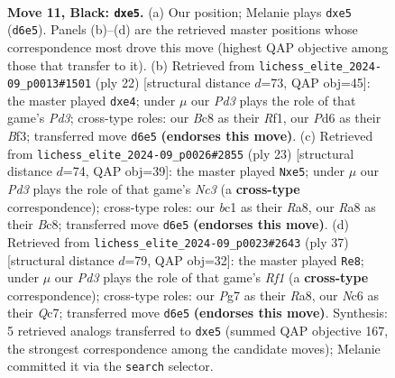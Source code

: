 \documentclass[11pt]{article}
\begin{document}
\clearpage

\begin{figure}[p]\centering
\begin{subfigure}{0.46\textwidth}\centering
\resizebox{\linewidth}{!}{%
\newchessgame
\chessboard[
  setfen={r1bqkb1r/pp3ppp/2np4/3pP3/3P3P/5N2/PP3PPK/RNBQ1R2 b q - 1 11},
  showmover=false,
  pgfstyle=straightmove, color=movearrow, markmove={d6-e5}
]}
\caption{}
\end{subfigure}\hfill
\begin{subfigure}{0.46\textwidth}\centering
\resizebox{\linewidth}{!}{%
\newchessgame
\chessboard[
  setfen={rn1qr1k1/pp3ppp/2pb1n2/8/4p3/2NP1BPP/PP3P2/R1BQ1RK1 w - - 0 12},
  showmover=false,
  pgfstyle=straightmove, color=movearrow, markmove={d3-e4}
]}
\caption{}
\end{subfigure}
\\[4pt]
\begin{subfigure}{0.46\textwidth}\centering
\resizebox{\linewidth}{!}{%
\newchessgame
\chessboard[
  setfen={r1bqkb1r/1p4pp/p1n5/3pNp2/1P1P4/P3B3/5PPP/RN1QK2R b KQkq - 0 12},
  showmover=false,
  pgfstyle=straightmove, color=movearrow, markmove={c6-e5}
]}
\caption{}
\end{subfigure}\hfill
\begin{subfigure}{0.46\textwidth}\centering
\resizebox{\linewidth}{!}{%
\newchessgame
\chessboard[
  setfen={r1b2rk1/1pq2pbp/6p1/p1B5/P3P1n1/1PPN1N2/2Q1RPPP/3R2K1 b - - 2 19},
  showmover=false,
  pgfstyle=straightmove, color=movearrow, markmove={f8-e8}
]}
\caption{}
\end{subfigure}
\caption{\textbf{Move 11, Black: \texttt{dxe5}.} (a) Our position; Melanie plays \texttt{dxe5} (\texttt{d6e5}). Panels (b)--(d) are the retrieved master positions whose correspondence most drove this move (highest QAP objective among those that transfer to it). (b) Retrieved from \texttt{lichess\_elite\_2024-09\_p0013\#1501} (ply 22) [structural distance $d$=73, QAP obj=45]: the master played \texttt{dxe4}; under $\mu$ our \emph{Pd3} plays the role of that game's \emph{Pd3}; cross-type roles: our \emph{B}c8 as their \emph{R}f1, our \emph{P}d6 as their \emph{B}f3; transferred move \texttt{d6e5} \textbf{(endorses this move)}. (c) Retrieved from \texttt{lichess\_elite\_2024-09\_p0026\#2855} (ply 23) [structural distance $d$=74, QAP obj=39]: the master played \texttt{Nxe5}; under $\mu$ our \emph{Pd3} plays the role of that game's \emph{Nc3} (a \textbf{cross-type} correspondence); cross-type roles: our \emph{b}c1 as their \emph{R}a8, our \emph{R}a8 as their \emph{B}c8; transferred move \texttt{d6e5} \textbf{(endorses this move)}. (d) Retrieved from \texttt{lichess\_elite\_2024-09\_p0023\#2643} (ply 37) [structural distance $d$=79, QAP obj=32]: the master played \texttt{Re8}; under $\mu$ our \emph{Pd3} plays the role of that game's \emph{Rf1} (a \textbf{cross-type} correspondence); cross-type roles: our \emph{P}g7 as their \emph{R}a8, our \emph{N}c6 as their \emph{Q}c7; transferred move \texttt{d6e5} \textbf{(endorses this move)}. Synthesis: 5 retrieved analogs transferred to \texttt{dxe5} (summed QAP objective 167, the strongest correspondence among the candidate moves); Melanie committed it via the \texttt{search} selector.}
\label{fig:thought-m21}
\end{figure}
\end{document}
